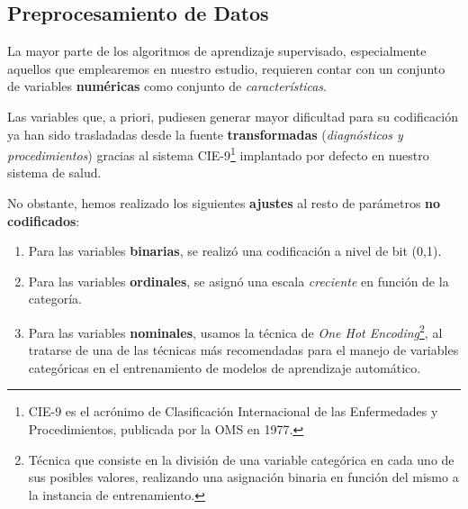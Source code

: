 

 \subsection{Preprocesamiento de Datos}

 La mayor parte de los algoritmos de aprendizaje supervisado, especialmente aquellos que emplearemos en nuestro estudio, requieren contar con un conjunto de variables \textbf{numéricas} como conjunto de \textit{características}.

 Las variables que, a priori, pudiesen generar mayor dificultad para su codificación ya han sido trasladadas desde la fuente \textbf{transformadas} (\textit{diagnósticos y procedimientos}) gracias al sistema CIE-9\footnote{CIE-9 es el acrónimo de Clasificación Internacional de las Enfermedades y Procedimientos, publicada por la OMS en 1977.} implantado por defecto en nuestro sistema de salud.

 No obstante, hemos realizado los siguientes \textbf{ajustes} al resto de parámetros \textbf{no codificados}:

 \begin{enumerate}
     \item Para las variables \textbf{binarias}, se realizó una codificación a nivel de bit (0,1).
     \item Para las variables \textbf{ordinales}, se asignó una escala \textit{creciente} en función de la categoría.
     \item Para las variables \textbf{nominales}, usamos la técnica de \textit{One Hot Encoding}\footnote{Técnica que consiste en la división de una variable categórica en cada uno de sus posibles valores, realizando una asignación binaria en función del mismo a la instancia de entrenamiento.}, al tratarse de una de las técnicas más recomendadas para el manejo de variables categóricas en el entrenamiento de modelos de aprendizaje automático\cite{Potdar2017AClassifiers}.
 \end{enumerate}

 